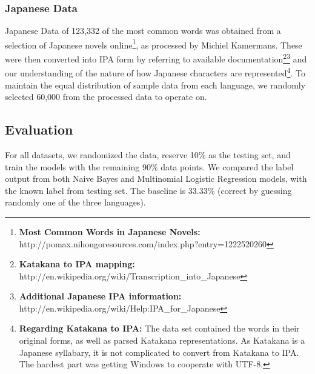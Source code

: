 \documentclass[a4paper]{article}
\begin{document}
\subsubsection{Japanese Data}
Japanese Data of 123,332 of the most common words was obtained from a selection of Japanese novels online\footnote{\textbf{Most Common Words in Japanese Novels:} http://pomax.nihongoresources.com/index.php?entry=1222520260}, as processed by Michiel Kamermans. These were then converted into IPA form by referring to available documentation\footnote{\textbf{Katakana to IPA mapping: }http://en.wikipedia.org/wiki/Transcription\_into\_Japanese}\footnote{\textbf{Additional Japanese IPA information: }http://en.wikipedia.org/wiki/Help:IPA\_for\_Japanese} and our understanding of the nature of how Japanese characters are represented\footnote{\textbf{Regarding Katakana to IPA: }The data set contained the words in their original forms, as well as parsed Katakana representations. As Katakana is a Japanese syllabary, it is not complicated to convert from Katakana to IPA. The hardest part was getting Windows to cooperate with UTF-8.}. To maintain the equal distribution of sample data from each language, we randomly selected 60,000 from the processed data to operate on.
\subsection{Evaluation}
For all datasets, we randomized the data, reserve 10\% as the testing set, and train the models with the remaining 90\% data points. We compared the label output from both Naive Bayes and Multinomial Logistic Regression models, with the known label from testing set. The baseline is 33.33\% (correct by guessing randomly one of the three languages).
\end{document}
